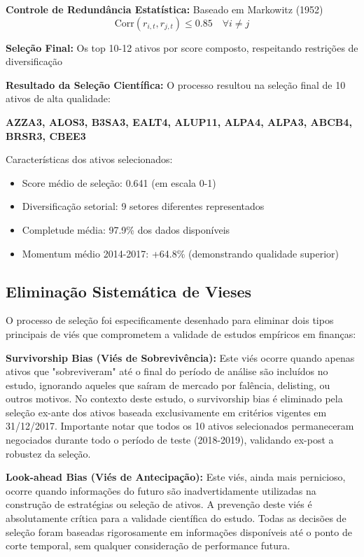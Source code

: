 \textbf{Controle de Redundância Estatística:} Baseado em Markowitz (1952)
\begin{equation}
\text{Corr}(r_{i,t}, r_{j,t}) \leq 0.85 \quad \forall i \neq j
\end{equation}

\textbf{Seleção Final:} Os top 10-12 ativos por score composto, respeitando restrições de diversificação

\textbf{Resultado da Seleção Científica:}
O processo resultou na seleção final de 10 ativos de alta qualidade:
\begin{center}
\textbf{AZZA3, ALOS3, B3SA3, EALT4, ALUP11, ALPA4, ALPA3, ABCB4, BRSR3, CBEE3}
\end{center}

Características dos ativos selecionados:
\begin{itemize}
    \item Score médio de seleção: 0.641 (em escala 0-1)
    \item Diversificação setorial: 9 setores diferentes representados
    \item Completude média: 97.9\% dos dados disponíveis
    \item Momentum médio 2014-2017: +64.8\% (demonstrando qualidade superior)
\end{itemize}

\subsection{Eliminação Sistemática de Vieses}

O processo de seleção foi especificamente desenhado para eliminar dois tipos principais de viés que comprometem a validade de estudos empíricos em finanças:

\textbf{Survivorship Bias (Viés de Sobrevivência):} Este viés ocorre quando apenas ativos que "sobreviveram" até o final do período de análise são incluídos no estudo, ignorando aqueles que saíram de mercado por falência, delisting, ou outros motivos. No contexto deste estudo, o survivorship bias é eliminado pela seleção ex-ante dos ativos baseada exclusivamente em critérios vigentes em 31/12/2017. Importante notar que todos os 10 ativos selecionados permaneceram negociados durante todo o período de teste (2018-2019), validando ex-post a robustez da seleção.

\textbf{Look-ahead Bias (Viés de Antecipação):} Este viés, ainda mais pernicioso, ocorre quando informações do futuro são inadvertidamente utilizadas na construção de estratégias ou seleção de ativos. A prevenção deste viés é absolutamente crítica para a validade científica do estudo. Todas as decisões de seleção foram baseadas rigorosamente em informações disponíveis até o ponto de corte temporal, sem qualquer consideração de performance futura.

